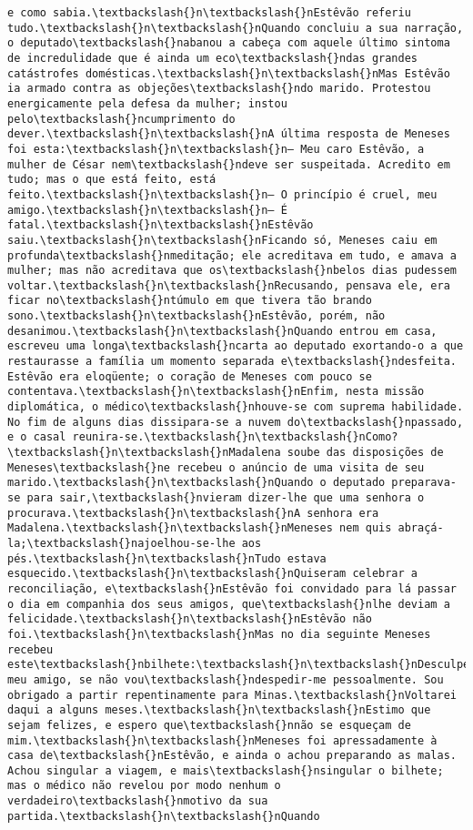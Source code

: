 \documentclass[11pt]{article}
\begin{document}
\begin{Verbatim}[commandchars=\\\{\}]
e como sabia.\textbackslash{}n\textbackslash{}nEstêvão referiu tudo.\textbackslash{}n\textbackslash{}nQuando concluiu a sua narração, o deputado\textbackslash{}nabanou a cabeça com aquele último sintoma de incredulidade que é ainda um eco\textbackslash{}ndas grandes catástrofes domésticas.\textbackslash{}n\textbackslash{}nMas Estêvão ia armado contra as objeções\textbackslash{}ndo marido. Protestou energicamente pela defesa da mulher; instou pelo\textbackslash{}ncumprimento do dever.\textbackslash{}n\textbackslash{}nA última resposta de Meneses foi esta:\textbackslash{}n\textbackslash{}n— Meu caro Estêvão, a mulher de César nem\textbackslash{}ndeve ser suspeitada. Acredito em tudo; mas o que está feito, está feito.\textbackslash{}n\textbackslash{}n— O princípio é cruel, meu amigo.\textbackslash{}n\textbackslash{}n— É fatal.\textbackslash{}n\textbackslash{}nEstêvão saiu.\textbackslash{}n\textbackslash{}nFicando só, Meneses caiu em profunda\textbackslash{}nmeditação; ele acreditava em tudo, e amava a mulher; mas não acreditava que os\textbackslash{}nbelos dias pudessem voltar.\textbackslash{}n\textbackslash{}nRecusando, pensava ele, era ficar no\textbackslash{}ntúmulo em que tivera tão brando sono.\textbackslash{}n\textbackslash{}nEstêvão, porém, não desanimou.\textbackslash{}n\textbackslash{}nQuando entrou em casa, escreveu uma longa\textbackslash{}ncarta ao deputado exortando-o a que restaurasse a família um momento separada e\textbackslash{}ndesfeita. Estêvão era eloqüente; o coração de Meneses com pouco se contentava.\textbackslash{}n\textbackslash{}nEnfim, nesta missão diplomática, o médico\textbackslash{}nhouve-se com suprema habilidade. No fim de alguns dias dissipara-se a nuvem do\textbackslash{}npassado, e o casal reunira-se.\textbackslash{}n\textbackslash{}nComo?\textbackslash{}n\textbackslash{}nMadalena soube das disposições de Meneses\textbackslash{}ne recebeu o anúncio de uma visita de seu marido.\textbackslash{}n\textbackslash{}nQuando o deputado preparava-se para sair,\textbackslash{}nvieram dizer-lhe que uma senhora o procurava.\textbackslash{}n\textbackslash{}nA senhora era Madalena.\textbackslash{}n\textbackslash{}nMeneses nem quis abraçá-la;\textbackslash{}najoelhou-se-lhe aos pés.\textbackslash{}n\textbackslash{}nTudo estava esquecido.\textbackslash{}n\textbackslash{}nQuiseram celebrar a reconciliação, e\textbackslash{}nEstêvão foi convidado para lá passar o dia em companhia dos seus amigos, que\textbackslash{}nlhe deviam a felicidade.\textbackslash{}n\textbackslash{}nEstêvão não foi.\textbackslash{}n\textbackslash{}nMas no dia seguinte Meneses recebeu este\textbackslash{}nbilhete:\textbackslash{}n\textbackslash{}nDesculpe, meu amigo, se não vou\textbackslash{}ndespedir-me pessoalmente. Sou obrigado a partir repentinamente para Minas.\textbackslash{}nVoltarei daqui a alguns meses.\textbackslash{}n\textbackslash{}nEstimo que sejam felizes, e espero que\textbackslash{}nnão se esqueçam de mim.\textbackslash{}n\textbackslash{}nMeneses foi apressadamente à casa de\textbackslash{}nEstêvão, e ainda o achou preparando as malas. Achou singular a viagem, e mais\textbackslash{}nsingular o bilhete; mas o médico não revelou por modo nenhum o verdadeiro\textbackslash{}nmotivo da sua partida.\textbackslash{}n\textbackslash{}nQuando 
\end{Verbatim}
\end{document}
